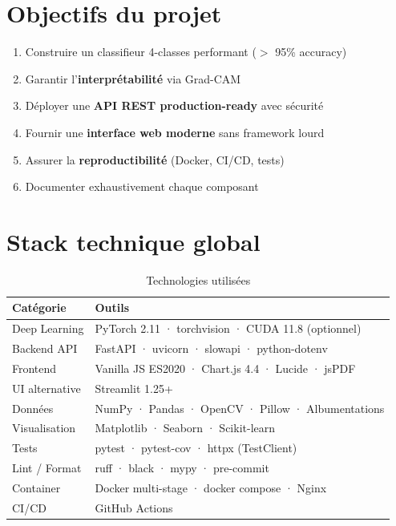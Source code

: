 \documentclass[11pt,a4paper,oneside]{report}
\begin{document}
\section{Objectifs du projet}

\begin{enumerate}
\item Construire un classifieur 4-classes performant ($>$ 95\% accuracy)
\item Garantir l'\textbf{interprétabilité} via Grad-CAM
\item Déployer une \textbf{API REST production-ready} avec sécurité
\item Fournir une \textbf{interface web moderne} sans framework lourd
\item Assurer la \textbf{reproductibilité} (Docker, CI/CD, tests)
\item Documenter exhaustivement chaque composant
\end{enumerate}

\section{Stack technique global}

\begin{table}[!htbp]
\centering
\caption{Technologies utilisées}
\begin{tabularx}{\textwidth}{|l|X|}
\hline
\textbf{Catégorie} & \textbf{Outils} \\
\hline
Deep Learning & PyTorch 2.11 · torchvision · CUDA 11.8 (optionnel) \\
\hline
Backend API & FastAPI · uvicorn · slowapi · python-dotenv \\
\hline
Frontend & Vanilla JS ES2020 · Chart.js 4.4 · Lucide · jsPDF \\
\hline
UI alternative & Streamlit 1.25+ \\
\hline
Données & NumPy · Pandas · OpenCV · Pillow · Albumentations \\
\hline
Visualisation & Matplotlib · Seaborn · Scikit-learn \\
\hline
Tests & pytest · pytest-cov · httpx (TestClient) \\
\hline
Lint / Format & ruff · black · mypy · pre-commit \\
\hline
Container & Docker multi-stage · docker compose · Nginx \\
\hline
CI/CD & GitHub Actions \\
\hline
\end{tabularx}
\end{table}
\end{document}
